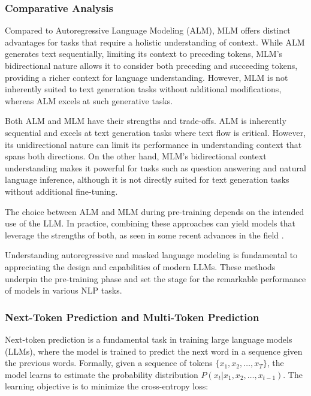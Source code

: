 \subsubsection{Comparative Analysis}

Compared to Autoregressive Language Modeling (ALM), MLM offers distinct advantages for tasks that require a holistic understanding of context. While ALM generates text sequentially, limiting its context to preceding tokens, MLM's bidirectional nature allows it to consider both preceding and succeeding tokens, providing a richer context for language understanding. However, MLM is not inherently suited to text generation tasks without additional modifications, whereas ALM excels at such generative tasks.

Both ALM and MLM have their strengths and trade-offs. ALM is inherently sequential and excels at text generation tasks where text flow is critical. However, its unidirectional nature can limit its performance in understanding context that spans both directions. On the other hand, MLM's bidirectional context understanding makes it powerful for tasks such as question answering and natural language inference, although it is not directly suited for text generation tasks without additional fine-tuning.

The choice between ALM and MLM during pre-training depends on the intended use of the LLM. In practice, combining these approaches can yield models that leverage the strengths of both, as seen in some recent advances in the field \cite{lewis2019bart}.

Understanding autoregressive and masked language modeling is fundamental to appreciating the design and capabilities of modern LLMs. These methods underpin the pre-training phase and set the stage for the remarkable performance of models in various NLP tasks.

\subsubsection{Next-Token Prediction and Multi-Token Prediction}

Next-token prediction is a fundamental task in training large language models (LLMs), where the model is trained to predict the next word in a sequence given the previous words. Formally, given a sequence of tokens \( \{x_1, x_2, \ldots, x_T\} \), the model learns to estimate the probability distribution \( P(x_t | x_1, x_2, \ldots, x_{t-1}) \). The learning objective is to minimize the cross-entropy loss:

